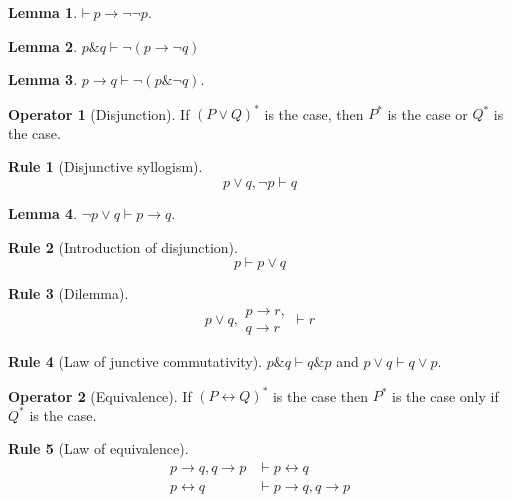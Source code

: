 \documentclass{amsbook}
\newcommand{\infers}{\mathrel\vdash}
\newcommand{\theorem}{\mathord\vdash\medspace}
\newcommand{\then}{\mathrel\rightarrow}
\newcommand{\conj}{\mathrel\&}
\newcommand{\eqv}{\mathrel\leftrightarrow}
\newcommand{\disj}{\mathrel\vee}
\theoremstyle{definition}
\newtheorem{frule}{Rule}[chapter]
\newtheorem{op}{Operator}[chapter]
\newtheorem{lmm}{Lemma}[section]
\begin{document}
\begin{lmm}
    $\theorem p \then \neg\neg p$.
\end{lmm}

\begin{lmm}
    $p \conj q \infers \neg(p \then \neg q)$
\end{lmm}

\begin{lmm}
    $p \then q \infers \neg(p \conj \neg q)$.
\end{lmm}

\begin{op}[Disjunction]
    If $(P \disj Q)^*$ is the case, then $P^*$ is the case or $Q^*$ is the case.
\end{op}

\begin{frule}[Disjunctive syllogism]
    $$p \disj q, \neg p \infers q$$
\end{frule}

\begin{lmm}
    $\neg p \disj q \infers p \then q$.
\end{lmm}

\begin{frule}[Introduction of disjunction]
    $$p \infers p \disj q$$
\end{frule}

\begin{frule}[Dilemma]
    $$p \disj q,\begin{aligned}
            p \then r, \\ q \then r
        \end{aligned} \infers r$$
\end{frule}

\begin{frule}[Law of junctive commutativity]
    $p \conj q \infers q \conj p$ and $p \disj q \infers q \disj p$.
\end{frule}

\begin{op}[Equivalence]
    If $(P \eqv Q)^*$ is the case then $P^*$ is the case only if $Q^*$ is the case.
\end{op}

\begin{frule}[Law of equivalence]
    \begin{align*}
        p \then q, q \then p & \infers p \eqv q             \\
        p \eqv q             & \infers p \then q, q \then p
    \end{align*}
\end{frule}
\end{document}
